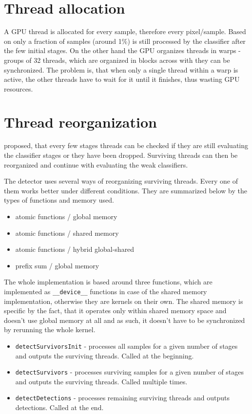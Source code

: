 \section{Thread allocation}\label{sec:thread-alloc}

A GPU thread is allocated for every sample, therefore every pixel/sample. Based on \cite{herout-realtime-cuda} only a fraction of samples (around 1\%) is still processed by the classifier after the few initial stages. On the other hand the GPU organizes threads in warps - groups of 32 threads, which are organized in blocks across with they can be synchronized. The problem is, that when only a single thread within a warp is active, the other threads have to wait for it until it finishes, thus wasting GPU resources.

\section{Thread reorganization}\label{subsec:thread-reorganization}

\cite{herout-realtime-cuda} proposed, that every few stages threads can be checked if they are still evaluating the classifier stages or they have been dropped. Surviving threads can then be reorganized and continue with evaluating the weak classifiers.

The detector uses several ways of reorganizing surviving threads. Every one of them works better under different conditions. They are summarized below by the types of functions and memory used.

\begin{itemize}
	\item atomic functions / global memory
	\item atomic functions / shared memory
	\item atomic functions / hybrid global-shared
	\item prefix sum / global memory
\end{itemize}

The whole implementation is based around three functions, which are implemented as \verb|__device__| functions in case of the shared memory implementation, otherwise they are kernels on their own. The shared memory is specific by the fact, that it operates only within shared memory space and doesn't use global memory at all and as such, it doesn't have to be synchronized by rerunning the whole kernel.

\begin{itemize}
	\item \verb|detectSurvivorsInit| - processes all samples for a given number of stages and outputs the surviving threads. Called at the beginning.
	\item \verb|detectSurvivors| - processes surviving samples for a given number of stages and outputs the surviving threads. Called multiple times.
	\item \verb|detectDetections| - processes remaining surviving threads and outputs detections. Called at the end.
\end{itemize}

